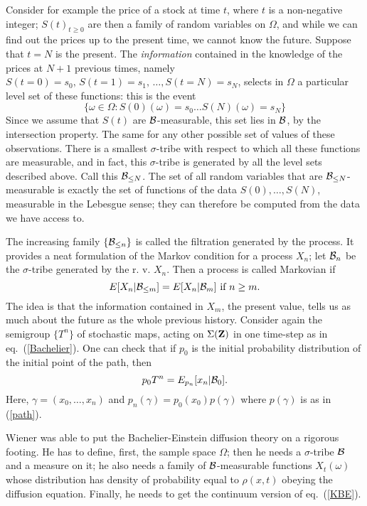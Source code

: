 Consider for example the price
of a stock at time $t$, where $t$ is a non-negative
integer; $S(t)_{t\geq0}$ are then a family of
random variables on $\Omega$, and while we can find out the prices
up to the present time, we cannot know the future. Suppose that $t=N$ is
the present. The {\em information}
contained in the knowledge of the prices at $N+1$ previous times, namely
$S(t=0)=s_0,\,S(t=1)=s_1,\,\ldots,S(t=N)=s_N$, selects in $\Omega$ a
particular level set of these functions: this is the event
\[\{\omega\in\Omega:S(0)(\omega)=s_0\ldots S(N)(\omega)=s_N\}\]
Since we assume that $S(t)$ are ${\cal B}$-measurable, this set lies in
${\cal B}$, by the intersection property. The same for any other possible
set of values of these observations. There is a smallest $\sigma$-tribe
with respect to which all these functions are measurable, and in fact,
this $\sigma$-tribe is generated by all the level sets described above.
Call this ${\cal B}_{\leq N}$. The set of all random variables that
are ${\cal B}_{\leq N}$-measurable is exactly the set of functions of the
data $S(0),\ldots,S(N)$, measurable in the Lebesgue sense; they can
therefore be computed from the data we have access to.

The increasing family $\{{\cal B}_{\leq n}\}$ is called the filtration
generated by the process.
It provides a neat formulation of the Markov condition for a process $X_n$;
let ${\cal B}_n$ be the $\sigma$-tribe generated by the r. v. $X_n$.
Then a process is called Markovian if
\begin{equation}
E[X_n|{\cal B}_{\leq m}]=E[X_n|{\cal B}_m]\mbox{ if }n\geq m.
\end{equation}
The idea is that the information contained in $X_m$, the present value,
tells us as much about the future as the whole previous history.
Consider again the semigroup $\{T^n\}$ of stochastic maps, acting on
$\Sigma({\bf Z})$ in one time-step as in eq.~(\ref{Bachelier}).
One can check that if $p_0$ is the initial probability distribution of
the initial point of the path, then
\begin{equation}
p_0T^n=E_{p_n}[x_n|{\cal B}_0].
\label{KBE}
\end{equation}
Here, $\gamma=(x_0,\ldots,x_n)$ and $p_n(\gamma)=p_0(x_0)p(\gamma)$
where $p(\gamma)$ is as in (\ref{path}).

Wiener \cite{Wiener} was able to put the Bachelier-Einstein diffusion
theory on a rigorous footing. He has to define, first, the sample space
$\Omega$; then
he needs a $\sigma$-tribe ${\cal B}$ and a measure on it; he also
needs a family of ${\cal B}$-measurable functions $X_t(\omega)$ whose
distribution has density of probability equal to $\rho(x,t)$ obeying the
diffusion equation. Finally, he needs to get the continuum version of
eq.~(\ref{KBE}).

